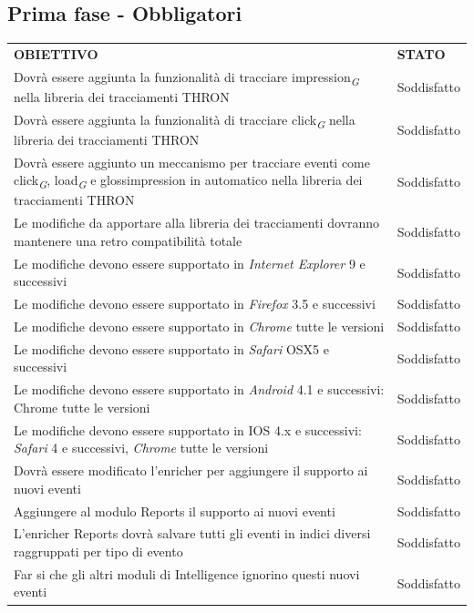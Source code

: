 \documentclass[a4paper, 12pt, twoside, openright]{book}
\newcommand{\gloss}[1]{#1\textsubscript{\textit{\tiny{G}}}}
\begin{document}
\subsection{Prima fase - Obbligatori}
\begin{tabular}{ m{26em} | m{5em} }
	\rowcolor{gray!50}
	\textbf{OBIETTIVO} & \textbf{STATO}\\
	Dovrà essere aggiunta la funzionalità di tracciare \gloss{impression} nella libreria dei tracciamenti THRON & Soddisfatto\\
	Dovrà essere aggiunta la funzionalità di tracciare \gloss{click} nella libreria dei tracciamenti THRON & Soddisfatto\\
	Dovrà essere aggiunto un meccanismo per tracciare eventi come \gloss{click}, \gloss{load} e gloss{impression} in automatico nella libreria dei tracciamenti THRON & Soddisfatto\\
	Le modifiche da apportare alla libreria dei tracciamenti dovranno mantenere una retro compatibilità totale & Soddisfatto\\
	Le modifiche devono essere supportato in \textit{Internet Explorer} 9 e successivi & Soddisfatto\\
	Le modifiche devono essere supportato in \textit{Firefox} 3.5 e successivi & Soddisfatto\\
	Le modifiche devono essere supportato in \textit{Chrome} tutte le versioni & Soddisfatto\\
	Le modifiche devono essere supportato in \textit{Safari} OSX5 e successivi & Soddisfatto\\
	Le modifiche devono essere supportato in \textit{Android} 4.1 e successivi: Chrome tutte le versioni & Soddisfatto\\
	Le modifiche devono essere supportato in IOS 4.x e successivi: \textit{Safari} 4 e successivi, \textit{Chrome} tutte le versioni & Soddisfatto\\
	Dovrà essere modificato l'enricher per aggiungere il supporto ai nuovi eventi & Soddisfatto\\
	Aggiungere al modulo Reports il supporto ai nuovi eventi & Soddisfatto\\
	L'enricher  Reports dovrà salvare tutti gli eventi in indici diversi raggruppati per tipo di evento & Soddisfatto\\
	Far si che gli altri moduli di Intelligence ignorino questi nuovi eventi & Soddisfatto\\
\end{tabular}
\end{document}
